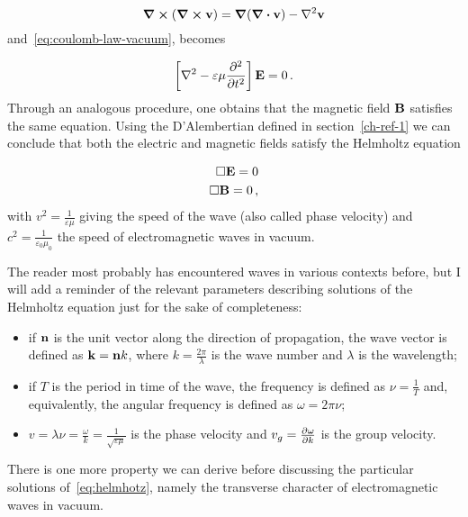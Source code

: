 \documentclass[12pt, class=report, crop=false]{standalone}
\begin{document}
\begin{equation}
  \label{id:curl-curl}
  \curl{(\curl{\vb{v}})} = \grad{(\div{\vb{v}})} - \laplacian{\vb{v}}
\end{equation}
and~\cref{eq:coulomb-law-vacuum}, becomes

\begin{equation}
  \left[ \laplacian{} - \varepsilon\mu \pdv[2]{t} \right] \vb{E} = 0 \,.
\end{equation}
Through an analogous procedure, one obtains that the magnetic field \(\vb{B}\) satisfies the same equation. Using the D'Alembertian defined in section~\ref{ch-ref-1} we can conclude that both the electric and magnetic fields satisfy the Helmholtz equation

\begin{subequations}
  \label{eq:helmhotz}
  \begin{align}
    \Box \vb{E} = 0 \\
    \Box \vb{B} = 0 \,,
  \end{align}
\end{subequations}
with \(v^2=\frac{1}{\varepsilon\mu}\) giving the speed of the wave (also called phase velocity) and \(c^2=\frac{1}{\varepsilon_0 \mu_0} \) the speed of electromagnetic waves in vacuum.

\par
The reader most probably has encountered waves in various contexts before, but I will add a reminder of the relevant parameters describing solutions of the Helmholtz equation just for the sake of completeness:

\begin{itemize}
  \item if \(\vb{n}\) is the unit vector along the direction of propagation, the wave vector is defined as \(\vb{k}=\vb{n} k \), where \( k =\frac{2\pi}{\lambda}\) is the wave number and \(\lambda\) is the wavelength;
  \item if \(T\) is the period in time of the wave, the frequency is defined as \(\nu = \frac{1}{T}\) and, equivalently, the angular frequency is defined as \(\omega  = 2\pi \nu\);
  \item \(v=\lambda\nu=\frac{\omega}{k}= \frac{1}{\sqrt{\varepsilon\mu}}\) is the phase velocity and \(v_g = \pdv{\omega}{k}\) is the group velocity.
\end{itemize}

\par
There is one more property we can derive before discussing the particular solutions of~\cref{eq:helmhotz}, namely the transverse character of electromagnetic waves in vacuum.
\end{document}
